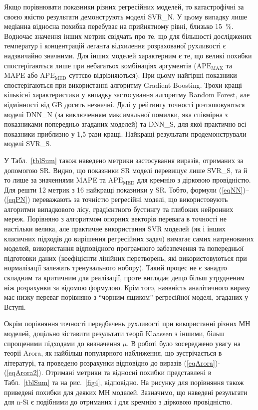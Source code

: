 \documentclass[fleqn,twoside,twocolumn,nofootinbib,showkeys]{revtex4} %
\begin{document}
Якщо порівнювати показники різних регресійних моделей, то
катастрофічні за своєю якістю результати демонструють моделі SVR\_N.
У цьому випадку лише медіанна відносна похибка перебуває на прийнятному рівні, близько 15~\%.
Водночас значення інших метрик свідчать про те, що для більшості досліджених температур і концентрацій леганта
відхилення розрахованої рухливості є надзвичайно значними.
Для інших моделей характерним є те, що великі похибки спостерігаються лише при небагатьох комбінаціях аргументів
($\mathrm{APE}_\mathrm{MAX}$ та MAPE або $\mathrm{APE}_\mathrm{MED}$ суттєво відрізняються).
При цьому найгірші показники спостерігаються при використанні алгоритму Gradient Boosting.
Трохи кращі кількісні характеристики у випадку застосування алгоритму Random Forest,
але відмінності від GB досить незначні.
Далі у рейтингу точності розташовуються моделі DNN\_N (за виключенням максимальної помилки, яка співмірна з
показниками попередньо згаданих моделей) та DNN\_S, для якої практично всі показники приблизно у 1,5 рази кращі.
Найкращі результати продемонстрували моделі SVR\_S.

У Табл.~\ref{tblSum} також наведено метрики застосування виразів, отриманих за допомогою SR.
Видно, що показники SR моделі перевищує лише SVR\_S, та й то лише
за значеннями MAPE та $\mathrm{APE}_\mathrm{MED}$ для кремнію з дірковою провідністю.
Для решти 12 метрик з 16 найкращі показники у SR.
Тобто, формули (\ref{eqNN})--(\ref{eqPN}) переважають за точністю регресійні моделі, що використовують алгоритми
випадкового лісу, градієнтного бустингу та глибоких нейронних мереж.
Порівняно з алгоритмом опорних векторів перевага в точності не настільки велика, але
практичне використання SVR моделей (як і інших класичних підходів до вирішення регресійних задач)
вимагає самих натренованих моделей, використання відповідного програмного забезпечення та попередньої підготовки даних
(коефіцієнти лінійних перетворень, які використовуються при нормалізації залежать тренувального нобору).
Такий процес не є занадто складним та критичним для реалізації, проте виглядає дещо більш утрудненим ніж розрахунки за відомою формулою.
Крім того, наявність аналітичного виразу має низку переваг порівняно з
``чорним ящиком'' регресійної моделі, згаданих у Вступі.

Окрім порівняння точності передбачень рухливості при використанні різних МН моделей,
доцільно зіставити результати теорії Klaassen з іншими, більш спрощеними підходами до визначення $\mu$.
В роботі було зосереджено увагу на теорії Arora, як найбільш популярного наближення, що зустрічається в літературі,
та проведено розрахунки відповідно до виразів (\ref{eqArora})-(\ref{eqArora2}).
Отримані метрики та відносні похибки представлені в Табл.~\ref{tblSum} та на рис.~\ref{fig4}, відповідно.
На рисунку для порівняння також приведені похибки для деяких МН моделей. 
Зазначимо, що наведені результати для n-Si є подібними до отриманих і для кремнію з дірковою провідністю.
\end{document}
